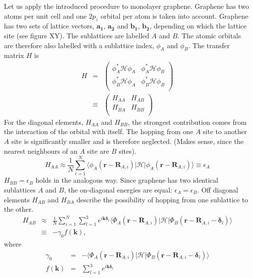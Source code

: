 Let us apply the introduced procedure to monolayer graphene. Graphene has two atoms per unit cell and  one $2p_z$ orbital per atom is taken into account. Graphene has two sets of lattice vectors, $\mathbf{a_1}$, $\mathbf{a_2}$ and $\mathbf{b_1}$, $\mathbf{b_2}$, depending on which the lattice site (see figure XY). The sublattices are labelled $A$ and $B$. The atomic orbitals are therefore also labelled with a sublattice index, $\phi_A$ and $\phi_B$. The transfer matrix $H$ is
\begin{eqnarray}
H &=& \begin{pmatrix}
\phi_A^* \mathcal{H} \phi_A & \phi_A^* \mathcal{H} \phi_B \\
\phi_B^* \mathcal{H} \phi_A & \phi_B^* \mathcal{H} \phi_B\\
\end{pmatrix} \\
&\equiv& \begin{pmatrix}
H_{A A} & H_{A B} \\
H_{B A} & H_{B B}\\
\end{pmatrix}
\end{eqnarray}
For the diagonal elements, $H_{A A}$ and $H_{B B}$, the strongest contribution comes from the interaction of the orbital with itself. The hopping from one $A$ site to another $A$ site is significantly smaller and is therefore neglected. (Makes sense, since the nearest neighbours of an $A$ site are $B$ sites).
\begin{equation}
H_{A A} \approx \frac{1}{N} \sum_{i=1}^N \langle \phi_A ( \mathbf{r} - \mathbf{R}_{A, i} ) | \mathcal{H} |  \phi_A ( \mathbf{r} - \mathbf{R}_{A, i} ) \rangle \equiv \epsilon_A
\end{equation}
$H_{B B} = \epsilon_B$ holds in the analogous way. Since graphene has two identical sublattices $A$ and $B$, the on-diagonal energies are equal: $\epsilon_A = \epsilon_B$. 
Off diagonal elements $H_{A B}$ and $H_{B A}$ describe the possibility of hopping from one sublattice to the other. 
\begin{eqnarray}
H_{A B } &\approx & \frac{1}{N} \sum_{i = 1}^N \sum_{l = 1}^3 e^{i \mathbf{k} \bm{\delta}_l} \langle \Phi_A ( \mathbf{r} - \mathbf{R}_{A, i} ) | \mathcal{H} | \Phi_B ( \mathbf{r} - \mathbf{R}_{A, i} - \bm{\delta}_l ) \rangle  \\
& \equiv & - \gamma_0 f \left( \mathbf{k} \right) \label{eq:gamma0},
\end{eqnarray}
where
\begin{eqnarray}
\gamma_0 &=& - \langle \Phi_A ( \mathbf{r} - \mathbf{R}_{A, i} )| \mathcal{H} | \Phi_B ( \mathbf{r} - \mathbf{R}_{A, i} - \bm{\delta}_l ) \rangle \\
f \left( \mathbf{k} \right) &=&  \sum_{l = 1}^3 e^{i \mathbf{k} \bm{\delta}_l} 
\end{eqnarray}
